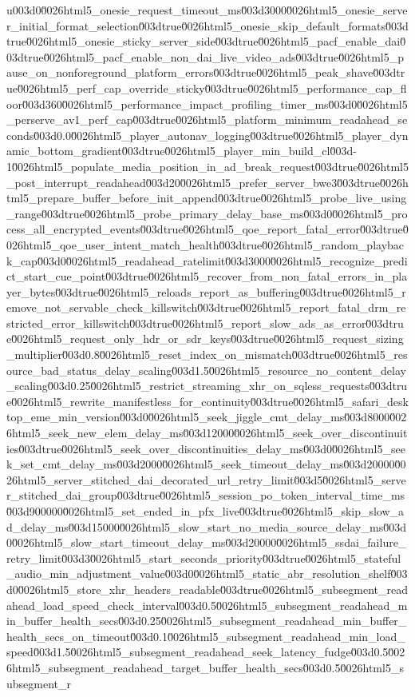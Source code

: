 {u003d0\u0026html5_onesie_request_timeout_ms\u003d3000\u0026html5_onesie_server_initial_format_selection\u003dtrue\u0026html5_onesie_skip_default_formats\u003dtrue\u0026html5_onesie_sticky_server_side\u003dtrue\u0026html5_pacf_enable_dai\u003dtrue\u0026html5_pacf_enable_non_dai_live_video_ads\u003dtrue\u0026html5_pause_on_nonforeground_platform_errors\u003dtrue\u0026html5_peak_shave\u003dtrue\u0026html5_perf_cap_override_sticky\u003dtrue\u0026html5_performance_cap_floor\u003d360\u0026html5_performance_impact_profiling_timer_ms\u003d0\u0026html5_perserve_av1_perf_cap\u003dtrue\u0026html5_platform_minimum_readahead_seconds\u003d0.0\u0026html5_player_autonav_logging\u003dtrue\u0026html5_player_dynamic_bottom_gradient\u003dtrue\u0026html5_player_min_build_cl\u003d-1\u0026html5_populate_media_position_in_ad_break_request\u003dtrue\u0026html5_post_interrupt_readahead\u003d20\u0026html5_prefer_server_bwe3\u003dtrue\u0026html5_prepare_buffer_before_init_append\u003dtrue\u0026html5_probe_live_using_range\u003dtrue\u0026html5_probe_primary_delay_base_ms\u003d0\u0026html5_process_all_encrypted_events\u003dtrue\u0026html5_qoe_report_fatal_error\u003dtrue\u0026html5_qoe_user_intent_match_health\u003dtrue\u0026html5_random_playback_cap\u003d0\u0026html5_readahead_ratelimit\u003d3000\u0026html5_recognize_predict_start_cue_point\u003dtrue\u0026html5_recover_from_non_fatal_errors_in_player_bytes\u003dtrue\u0026html5_reloads_report_as_buffering\u003dtrue\u0026html5_remove_not_servable_check_killswitch\u003dtrue\u0026html5_report_fatal_drm_restricted_error_killswitch\u003dtrue\u0026html5_report_slow_ads_as_error\u003dtrue\u0026html5_request_only_hdr_or_sdr_keys\u003dtrue\u0026html5_request_sizing_multiplier\u003d0.8\u0026html5_reset_index_on_mismatch\u003dtrue\u0026html5_resource_bad_status_delay_scaling\u003d1.5\u0026html5_resource_no_content_delay_scaling\u003d0.25\u0026html5_restrict_streaming_xhr_on_sqless_requests\u003dtrue\u0026html5_rewrite_manifestless_for_continuity\u003dtrue\u0026html5_safari_desktop_eme_min_version\u003d0\u0026html5_seek_jiggle_cmt_delay_ms\u003d8000\u0026html5_seek_new_elem_delay_ms\u003d12000\u0026html5_seek_over_discontinuities\u003dtrue\u0026html5_seek_over_discontinuities_delay_ms\u003d0\u0026html5_seek_set_cmt_delay_ms\u003d2000\u0026html5_seek_timeout_delay_ms\u003d20000\u0026html5_server_stitched_dai_decorated_url_retry_limit\u003d5\u0026html5_server_stitched_dai_group\u003dtrue\u0026html5_session_po_token_interval_time_ms\u003d900000\u0026html5_set_ended_in_pfx_live\u003dtrue\u0026html5_skip_slow_ad_delay_ms\u003d15000\u0026html5_slow_start_no_media_source_delay_ms\u003d0\u0026html5_slow_start_timeout_delay_ms\u003d20000\u0026html5_ssdai_failure_retry_limit\u003d3\u0026html5_start_seconds_priority\u003dtrue\u0026html5_stateful_audio_min_adjustment_value\u003d0\u0026html5_static_abr_resolution_shelf\u003d0\u0026html5_store_xhr_headers_readable\u003dtrue\u0026html5_subsegment_readahead_load_speed_check_interval\u003d0.5\u0026html5_subsegment_readahead_min_buffer_health_secs\u003d0.25\u0026html5_subsegment_readahead_min_buffer_health_secs_on_timeout\u003d0.1\u0026html5_subsegment_readahead_min_load_speed\u003d1.5\u0026html5_subsegment_readahead_seek_latency_fudge\u003d0.5\u0026html5_subsegment_readahead_target_buffer_health_secs\u003d0.5\u0026html5_subsegment_r}
